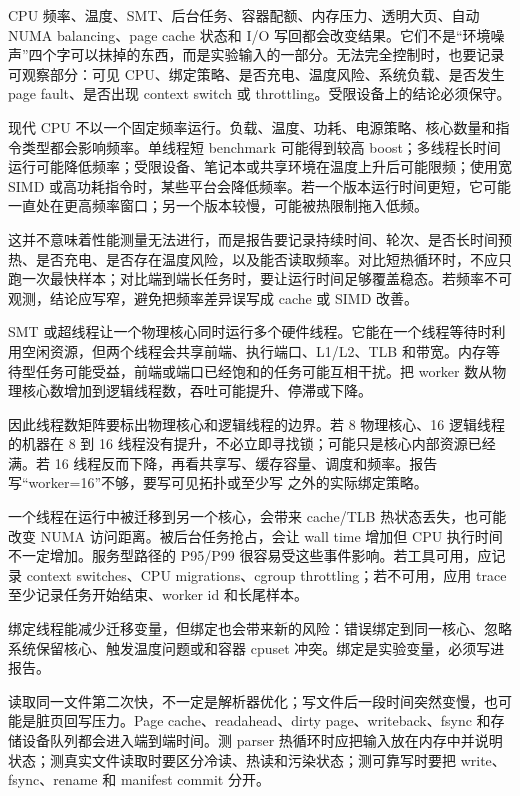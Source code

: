 CPU 频率、温度、SMT、后台任务、容器配额、内存压力、透明大页、自动 NUMA balancing、page cache 状态和 I/O 写回都会改变结果。它们不是“环境噪声”四个字可以抹掉的东西，而是实验输入的一部分。无法完全控制时，也要记录可观察部分：可见 CPU、绑定策略、是否充电、温度风险、系统负载、是否发生 page fault、是否出现 context switch 或 throttling。受限设备上的结论必须保守。

现代 CPU 不以一个固定频率运行。负载、温度、功耗、电源策略、核心数量和指令类型都会影响频率。单线程短 benchmark 可能得到较高 boost；多线程长时间运行可能降低频率；受限设备、笔记本或共享环境在温度上升后可能限频；使用宽 SIMD 或高功耗指令时，某些平台会降低频率。若一个版本运行时间更短，它可能一直处在更高频率窗口；另一个版本较慢，可能被热限制拖入低频。

这并不意味着性能测量无法进行，而是报告要记录持续时间、轮次、是否长时间预热、是否充电、是否存在温度风险，以及能否读取频率。对比短热循环时，不应只跑一次最快样本；对比端到端长任务时，要让运行时间足够覆盖稳态。若频率不可观测，结论应写窄，避免把频率差异误写成 cache 或 SIMD 改善。

SMT 或超线程让一个物理核心同时运行多个硬件线程。它能在一个线程等待时利用空闲资源，但两个线程会共享前端、执行端口、L1/L2、TLB 和带宽。内存等待型任务可能受益，前端或端口已经饱和的任务可能互相干扰。把 worker 数从物理核心数增加到逻辑线程数，吞吐可能提升、停滞或下降。

因此线程数矩阵要标出物理核心和逻辑线程的边界。若 8 物理核心、16 逻辑线程的机器在 8 到 16 线程没有提升，不必立即寻找锁；可能只是核心内部资源已经满。若 16 线程反而下降，再看共享写、缓存容量、调度和频率。报告写“worker=16”不够，要写可见拓扑或至少写  之外的实际绑定策略。

一个线程在运行中被迁移到另一个核心，会带来 cache/TLB 热状态丢失，也可能改变 NUMA 访问距离。被后台任务抢占，会让 wall time 增加但 CPU 执行时间不一定增加。服务型路径的 P95/P99 很容易受这些事件影响。若工具可用，应记录 context switches、CPU migrations、cgroup throttling；若不可用，应用 trace 至少记录任务开始结束、worker id 和长尾样本。

绑定线程能减少迁移变量，但绑定也会带来新的风险：错误绑定到同一核心、忽略系统保留核心、触发温度问题或和容器 cpuset 冲突。绑定是实验变量，必须写进报告。

读取同一文件第二次快，不一定是解析器优化；写文件后一段时间突然变慢，也可能是脏页回写压力。Page cache、readahead、dirty page、writeback、fsync 和存储设备队列都会进入端到端时间。测 parser 热循环时应把输入放在内存中并说明状态；测真实文件读取时要区分冷读、热读和污染状态；测可靠写时要把 write、fsync、rename 和 manifest commit 分开。

